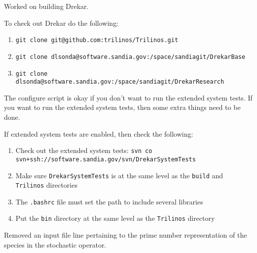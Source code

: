 Worked on building Drekar.

\begin{tcolorbox}[colback=blue!5, colframe=blue!40!black, title=Checking out Drekar]
To check out Drekar do the following:  
\small
\begin{enumerate}
  \item \texttt{git clone git@github.com:trilinos/Trilinos.git}
  \item \texttt{git clone dlsonda@software.sandia.gov:/space/sandiagit/DrekarBase}
  \item \texttt{git clone dlsonda@software.sandia.gov:/space/sandiagit/DrekarResearch}
\end{enumerate}
\normalsize
\end{tcolorbox}
The configure script is okay if you don't want to run the extended system tests.  If you want to run the extended system tests, then some extra things need to be done.
\begin{tcolorbox}[colback=blue!5, colframe=blue!40!black, title=Configuring Drekar with Extended System Tests]
If extended system tests are enabled, then check the following:
\begin{enumerate}
  \item Check out the extended system tests: \hfill \texttt{svn co svn+ssh://software.sandia.gov/svn/DrekarSystemTests} 
  \item Make sure \texttt{DrekarSystemTests} is at the same level as the \texttt{build} and \texttt{Trilinos} directories
  \item The \texttt{.bashrc} file must set the path to include several libraries
  \item Put the \texttt{bin} directory at the same level as the \texttt{Trilinos} directory
\end{enumerate}
\end{tcolorbox}

Removed an input file line pertaining to the prime number representation of the species in the stochastic operator.

